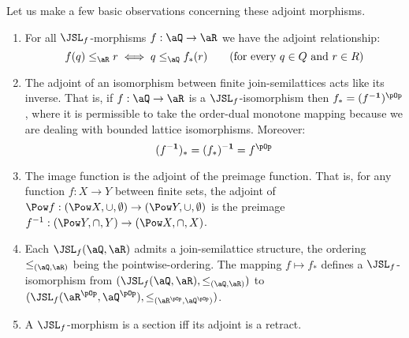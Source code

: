 \documentclass{article}
\begin{document}
Let us make a few basic observations concerning these adjoint morphisms.



\begin{lemma}
\label{lem:adj_obs}
\item
\begin{enumerate}
\item
For all $\JSL_f$-morphisms $f : \aQ \to \aR$ we have the adjoint relationship:
\[
f(q) \leq_\aR r
\iff q \leq_\aQ f_*(r)
\qquad
\text{(for every $q \in Q$ and $r \in R$)}
\]

\item
The adjoint of an isomorphism between finite join-semilattices acts like its inverse. That is, if $f : \aQ \to \aR$ is a $\JSL_f$-isomorphism then $f_* = (f^{\bf-1})^{\pOp}$, where it is permissible to take the order-dual monotone mapping because we are dealing with bounded lattice isomorphisms. Moreover:
\[
(f^{\bf-1})_* = (f_*)^{\bf-1} = f^{\pOp}
\]


\item
The image function is the adjoint of the preimage function. That is, for any function $f : X \to Y$ between finite sets, the adjoint of $\Pow f : (\Pow X,\cup,\emptyset) \to (\Pow Y,\cup,\emptyset)$ is the preimage $f^{-1} : (\Pow Y,\cap,Y) \to (\Pow X,\cap,X)$.

\item
Each $\JSL_f(\aQ,\aR)$ admits a join-semilattice structure, the ordering $\leq_{(\aQ,\aR)}$ being the pointwise-ordering. The mapping $f \mapsto f_*$ defines a $\JSL_f$-isomorphism from $(\JSL_f(\aQ,\aR),\leq_{(\aQ,\aR)})$ to $(\JSL_f(\aR^{\pOp},\aQ^{\pOp}),\leq_{(\aR^{\pOp},\aQ^{\pOp})})$.

\item
A $\JSL_f$-morphism is a section iff its adjoint is a retract.

\end{enumerate}
\end{lemma}
\end{document}
